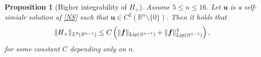 \documentclass[12pt]{amsart}
\newtheorem{pro}[theorem]{Proposition}
\renewcommand{\div}{{\rm div \thinspace }}
\newcommand{\Bu}{{\boldsymbol{u}}}
\newcommand{\Bf}{{\boldsymbol{f}}}
\begin{document}
\begin{pro}[Higher integrability of $H_+$] \label{higherint2} 
	Assume $5\leq n \leq 16$. Let $\Bu$ is a self-simialr solution of \eqref{NS} such that $\Bu \in C^2(\mathbb{R}^n \setminus\{0\})$. Then 
	it holds that
	\begin{equation*}
		\|H_{+}\|_{L^\theta(S^{n-1})} \leq C \left(\|\Bf\|_{\textnormal{Lip}(S^{n-1})} + \|\Bf\|_{\textnormal{Lip}(S^{n-1})}^{4}\right),
	\end{equation*}
	for some constant $C$ depending only on $n$.   
\end{pro}
\end{document}
